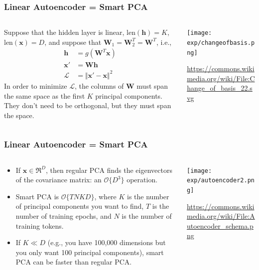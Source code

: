 \documentclass{beamer}
\begin{document}
\begin{frame}
  \frametitle{Linear Autoencoder = Smart PCA}
  \begin{columns}
    \begin{column}{0.5\textwidth}
      Suppose that the hidden layer is linear, $\text{len}(\bm{h})=K$,
      $\text{len}(\bm{x})=D$, and suppose that
      $\bm{W}_1=\bm{W}_2^T=\bm{W}^T$, i.e.,
      \begin{align*}
        \bm{h}&=g\left(\bm{W}^T\bm{x}\right)\\
        \bm{x'}&=\bm{W}\bm{h}\\
        \mathcal{L}&=\Vert\bm{x'}-\bm{x}\Vert^2
      \end{align*}
      In order to minimize $\mathcal{L}$, the columns of $\bm{W}$ must
      span the same space as the first $K$ principal components.  They
      don't need to be orthogonal, but they must span the space.
    \end{column}
    \begin{column}{0.5\textwidth}
      \texttt{[image: exp/changeofbasis.png]}

      \url{https://commons.wikimedia.org/wiki/File:Change_of_basis_22.svg}
    \end{column}
  \end{columns}
\end{frame}

\begin{frame}
  \frametitle{Linear Autoencoder = Smart PCA}
  \begin{columns}
    \begin{column}{0.7\textwidth}
      \begin{itemize}
      \item If $\bm{x}\in\Re^D$, then regular PCA finds the
        eigenvectors of the covariance matrix: an $\mathcal{O}\{D^3\}$
        operation.
      \item Smart PCA is $\mathcal{O}\{TNKD\}$, where $K$ is the
        number of principal components you want to find, $T$ is the
        number of training epochs, and $N$ is the number of training
        tokens.
      \item If $K\ll D$ (e.g., you have 100,000 dimensions but you
        only want 100 principal components), smart PCA can be faster
        than regular PCA.
      \end{itemize}
    \end{column}
    \begin{column}{0.3\textwidth}
      \texttt{[image: exp/autoencoder2.png]}

      \url{https://commons.wikimedia.org/wiki/File:Autoencoder_schema.png}
    \end{column}
  \end{columns}
\end{frame}
\end{document}
